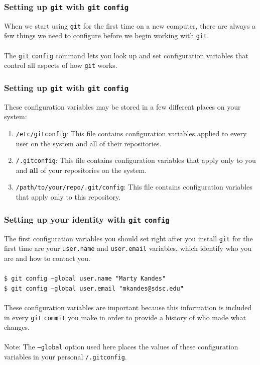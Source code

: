 \documentclass{beamer}
\begin{document}
\begin{frame}
   \frametitle{Setting up \texttt{git} with \texttt{git} \texttt{config}}
   When we start using \texttt{git} for the first time on a new 
   computer, there are always a few things we need to configure
   before we begin working with \texttt{git}. 
   \\ \ \\
   The \texttt{git} \texttt{config} command lets you look up and set 
   configuration variables that control all aspects of how \texttt{git} 
   works.
\end{frame}

\begin{frame}
   \frametitle{Setting up \texttt{git} with \texttt{git} \texttt{config}}
   These configuration variables may be stored in a few different places
   on your system: \\
   \begin{enumerate}
      \setlength\itemsep{1.0em}
      \item \texttt{/etc/gitconfig}: This file contains configuration
         variables applied to every user on the system and all of their
         repositories.
      \item \texttt{{\selectfont\texttildelow}/.gitconfig}: 
         This file contains configuration variables that apply only to 
         you and \textbf{all} of your repositories on the system.
      \item \texttt{{\selectfont\texttildelow}/path/to/your/repo/.git/config}: This file contains configuration variables that 
         apply only to this repository.
   \end{enumerate}
\end{frame}

\begin{frame}
   \frametitle{Setting up your identity with \texttt{git} \texttt{config}}
   The first configuration variables you should set right after you install 
   \texttt{git} for the first time are your \texttt{user.name} and 
   \texttt{user.email} variables, which identify who you are and how to 
   contact you. 
   \\ \ \\
   \texttt{\hspace{1.0em}\$ git config --global user.name "Marty Kandes" \\
           \hspace{1.0em}\$ git config --global user.email "mkandes@sdsc.edu"}
   \\ \ \\
   These configuration variables are important because this information 
   is included in every \texttt{git} \texttt{commit} you make in order to 
   provide a history of who made what changes.
   \\ \ \\
   Note: The \texttt{--global} option used here places the values of 
   these configuration variables in your personal 
   \texttt{{\selectfont\texttildelow}/.gitconfig}.
\end{frame}
\end{document}
